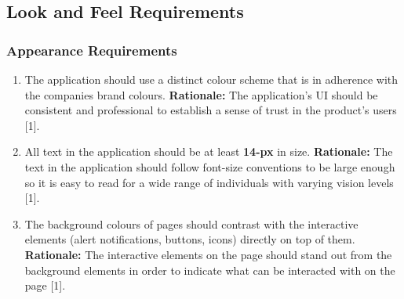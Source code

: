 \documentclass[]{article}
\begin{document}
\subsection{Look and Feel Requirements}
\label{sub:look_and_feel_requirements}

\subsubsection{Appearance Requirements}
\label{ssub:appearance_requirements}
\begin{enumerate}[{LF-A}1. ]
	\item The application should use a distinct colour scheme that is in adherence with the companies brand colours.\newline
	{\bf Rationale:} The application's UI should be consistent and professional to establish a sense of trust in the product's users [1].
	\item All text in the application should be at least \textbf{14-px} in size.\newline
	{\bf Rationale:} The text in the application should follow font-size conventions to be large enough so it is easy to read for a wide range of individuals with varying vision levels [1].
	\item The background colours of pages should contrast with the interactive elements (alert notifications, buttons, icons) directly on top of them.\newline
	{\bf Rationale:} The interactive elements on the page should stand out from the background elements in order to indicate what can be interacted with on the page [1].

\end{enumerate}
\end{document}
